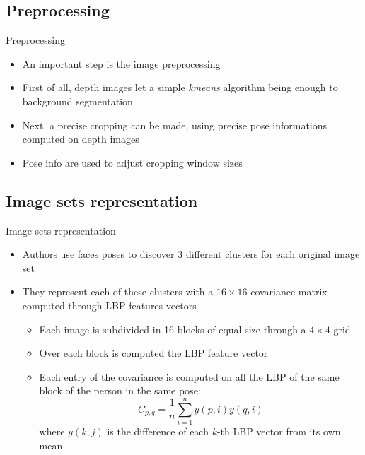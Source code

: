 \documentclass{beamer}
\begin{document}
\subsection{Preprocessing}
\begin{frame}{Preprocessing}
	\begin{itemize}
		\item An important step is the image preprocessing
		\item First of all, depth images let a simple \textit{kmeans}
			algorithm being enough to background segmentation
		\item Next, a precise cropping can be made, using precise pose
			informations computed on depth images
		\item Pose info are used to adjust cropping window sizes
	\end{itemize}
\end{frame}

\subsection{Image sets representation}
\begin{frame}{Image sets representation}
	\begin{itemize}
		\item Authors use faces poses to discover 3 different clusters
			for each original image set
		\item They represent each of these clusters with a $16 \times
			16$ covariance matrix computed through LBP features
			vectors
			\begin{itemize}
				\item Each image is subdivided in 16 blocks of
					equal size through a $4 \times 4$ grid
				\item Over each block is computed the LBP
					feature vector
				\item Each entry of the covariance is computed
					on all the LBP of the same block of the
					person in the same pose:
					$$
					C_{p, q} = \frac{1}{n} \sum_{i=1}^n
					y(p, i)y(q, i)
					$$
					where $y(k, j)$ is the difference of
					each $k$-th LBP vector from
					its own mean

			\end{itemize}
	\end{itemize}
\end{frame}
\end{document}
